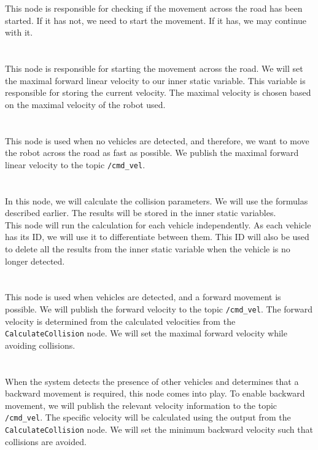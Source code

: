         This node is responsible for checking if the movement across the road has been started. If it has not, we need to start the movement. If it has, we may continue with it.\\\\
    \\
        This node is responsible for starting the movement across the road. We will set the maximal forward linear velocity to our inner static variable. This variable is responsible for storing the current velocity. The maximal velocity is chosen based on the maximal velocity of the robot used.\\\\
    \\
        This node is used when no vehicles are detected, and therefore, we want to move the robot across the road as fast as possible. We publish the maximal forward linear velocity to the topic \texttt{/cmd\_vel}.\\\\
    \\
        In this node, we will calculate the collision parameters. We will use the formulas described earlier. The results will be stored in the inner static variables.\\
        This node will run the calculation for each vehicle independently. As each vehicle has its ID, we will use it to differentiate between them. This ID will also be used to delete all the results from the inner static variable when the vehicle is no longer detected.\\\\
    \\
        This node is used when vehicles are detected, and a forward movement is possible. We will publish the forward velocity to the topic \texttt{/cmd\_vel}. The forward velocity is determined from the calculated velocities from the \texttt{CalculateCollision} node. We will set the maximal forward velocity while avoiding collisions.\\\\
    \\
        When the system detects the presence of other vehicles and determines that a backward movement is required, this node comes into play. To enable backward movement, we will publish the relevant velocity information to the topic \texttt{/cmd\_vel}. The specific velocity will be calculated using the output from the \texttt{CalculateCollision} node. We will set the minimum backward velocity such that collisions are avoided.\\\\
